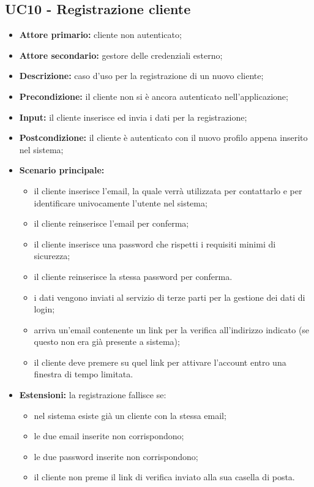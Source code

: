 \subsection{UC10 - Registrazione cliente}
\label{UC10}
\begin{itemize}
    \item \textbf{Attore primario:} cliente non autenticato;
    \item \textbf{Attore secondario:} gestore delle credenziali esterno;
    \item \textbf{Descrizione:} caso d'uso per la registrazione di un nuovo cliente;
    \item \textbf{Precondizione:} il cliente non si è ancora autenticato nell'applicazione;
    \item \textbf{Input:} il cliente inserisce ed invia i dati per la registrazione;
    \item \textbf{Postcondizione:} il cliente è autenticato con il nuovo profilo appena inserito nel sistema;
    \item \textbf{Scenario principale:}
    \begin{itemize}
        \item il cliente inserisce l'email, la quale verrà utilizzata per contattarlo e per identificare univocamente l'utente nel sistema;
        \item il cliente reinserisce l'email per conferma;
        \item il cliente inserisce una password che rispetti i requisiti minimi di sicurezza;
        \item il cliente reinserisce la stessa password per conferma.
        \item i dati vengono inviati al servizio di terze parti per la gestione dei dati di login;
        \item arriva un'email contenente un link per la verifica all'indirizzo indicato (se questo non era già presente a sistema);
        \item il cliente deve premere su quel link per attivare l'account entro una finestra di tempo limitata.
    \end{itemize}
    \item \textbf{Estensioni:} la registrazione fallisce se:
    \begin{itemize}
        \item nel sistema esiste già un cliente con la stessa email;
        \item le due email inserite non corrispondono;
        \item le due password inserite non corrispondono;
        \item il cliente non preme il link di verifica inviato alla sua casella di posta.
    \end{itemize}
\end{itemize}


